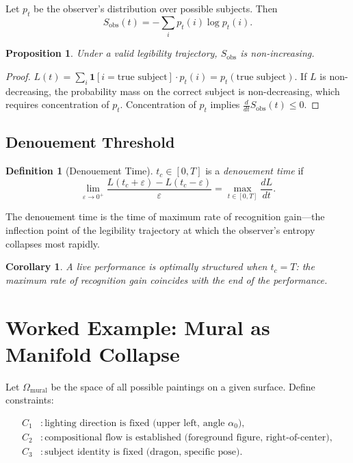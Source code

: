 \documentclass[12pt, twoside]{article}
\theoremstyle{plain}
\newtheorem{proposition}[theorem]{Proposition}
\newtheorem{corollary}[theorem]{Corollary}
\theoremstyle{definition}
\newtheorem{definition}[theorem]{Definition}
\theoremstyle{remark}
\begin{document}
Let $p_t$ be the observer's distribution over possible subjects. Then
\[
S_{\text{obs}}(t) = -\sum_i p_t(i) \log p_t(i).
\]

\begin{proposition}
Under a valid legibility trajectory, $S_{\text{obs}}$ is non-increasing.
\end{proposition}

\begin{proof}
$L(t) = \sum_i \mathbf{1}[i = \text{true subject}] \cdot p_t(i) = p_t(\text{true subject})$. If $L$ is non-decreasing, the probability mass on the correct subject is non-decreasing, which requires concentration of $p_t$. Concentration of $p_t$ implies $\frac{d}{dt} S_{\text{obs}}(t) \leq 0$.
\end{proof}

\subsection{Denouement Threshold}

\begin{definition}[Denouement Time]
$t_c \in [0, T]$ is a \emph{denouement time} if
\[
\lim_{\varepsilon \to 0^+} \frac{L(t_c + \varepsilon) - L(t_c - \varepsilon)}{\varepsilon} = \max_{t \in [0,T]} \frac{dL}{dt}.
\]
\end{definition}

The denouement time is the time of maximum rate of recognition gain---the inflection point of the legibility trajectory at which the observer's entropy collapses most rapidly.

\begin{corollary}
A live performance is optimally structured when $t_c = T$: the maximum rate of recognition gain coincides with the end of the performance.
\end{corollary}

\section{Worked Example: Mural as Manifold Collapse}
\label{app:mural}

Let $\Omega_{\text{mural}}$ be the space of all possible paintings on a given surface. Define constraints:

\begin{align*}
C_1 &: \text{lighting direction is fixed (upper left, angle } \alpha_0\text{)}, \\
C_2 &: \text{compositional flow is established (foreground figure, right-of-center)}, \\
C_3 &: \text{subject identity is fixed (dragon, specific pose)}.
\end{align*}
\end{document}
